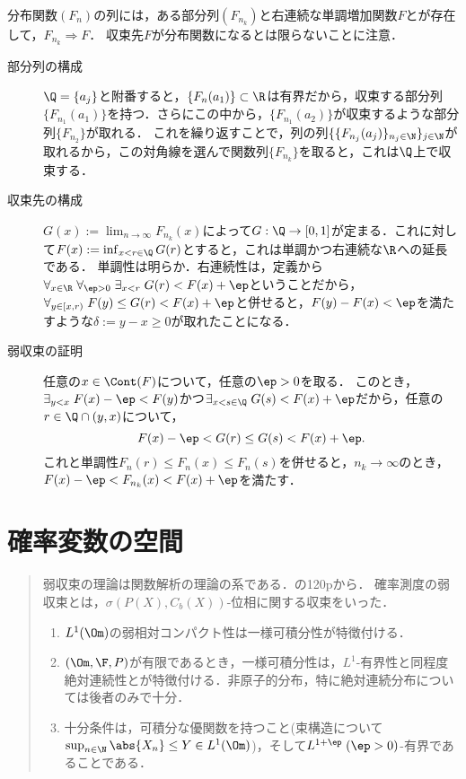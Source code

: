 \documentclass[uplatex,dvipdfmx]{jsreport}
\begin{document}
\begin{theorem}
    分布関数$(F_n)$の列には，ある部分列$(F_{n_k})$と右連続な単調増加関数$F$とが存在して，$F_{n_k}\Rightarrow F$．
    収束先$F$が分布関数になるとは限らないことに注意．
\end{theorem}
\begin{Proof}\mbox{}
    \begin{description}
        \item[部分列の構成] $\Q=\{a_j\}$と附番すると，$\{F_n(a_1)\}\subset\R$は有界だから，収束する部分列$\{F_{n_1}(a_1)\}$を持つ．さらにこの中から，$\{F_{n_1}(a_2)\}$が収束するような部分列$\{F_{n_2}\}$が取れる．
        これを繰り返すことで，列の列$\{\{F_{n_j}(a_j)\}_{n_j\in\N}\}_{j\in\N}$が取れるから，この対角線を選んで関数列$\{F_{n_k}\}$を取ると，これは$\Q$上で収束する．
        \item[収束先の構成] $G(x):=\lim_{n\to\infty}F_{n_k}(x)$によって$G:\Q\to[0,1]$が定まる．これに対して$F(x):=\inf_{x<r\in\Q}G(r)$とすると，これは単調かつ右連続な$\R$への延長である．
        単調性は明らか．右連続性は，定義から$\forall_{x\in\R}\;\forall_{\ep>0}\;\exists_{x<r}\;G(r)<F(x)+\ep$ということだから，$\forall_{y\in[x,r)}\;F(y)\le G(r)<F(x)+\ep$と併せると，$F(y)-F(x)<\ep$を満たすような$\delta:=y-x\ge0$が取れたことになる．
        \item[弱収束の証明]
        任意の$x\in\Cont(F)$について，任意の$\ep>0$を取る．
        このとき，$\exists_{y<x}\;F(x)-\ep<F(y)$かつ$\exists_{x<s\in\Q}\;G(s)<F(x)+\ep$だから，任意の$r\in\Q\cap(y,x)$について，
        \[F(x)-\ep<G(r)\le G(s)<F(x)+\ep.\]
        これと単調性$F_n(r)\le F_n(x)\le F_n(s)$を併せると，$n_k\to\infty$のとき，$F(x)-\ep<F_{n_k}(x)<F(x)+\ep$を満たす．
    \end{description}
\end{Proof}

\chapter{確率変数の空間}

\begin{quotation}
    弱収束の理論は関数解析の理論の系である．\cite{Yoshida}の120pから．
    確率測度の弱収束とは，$\sigma(P(X),C_b(X))$-位相に関する収束をいった．
    \begin{enumerate}
        \item $L^1(\Om)$の弱相対コンパクト性は一様可積分性が特徴付ける．
        \item $(\Om,\F,P)$が有限であるとき，一様可積分性は，$L^1$-有界性と同程度絶対連続性とが特徴付ける．非原子的分布，特に絶対連続分布については後者のみで十分．
        \item 十分条件は，可積分な優関数を持つこと(束構造について$\sup_{n\in\N}\abs{X_n}\le Y\in L^1(\Om)$)，そして$L^{1+\ep}\;(\ep>0)$-有界であることである．
    \end{enumerate}
\end{quotation}
\end{document}
